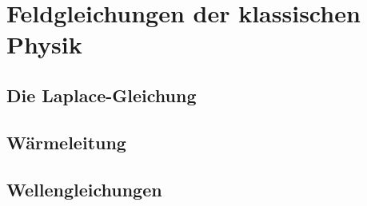 %
%
%
\chapter{Feldgleichungen der klassischen Physik
\label{chapter:feldgleichungen}}

\section{Die Laplace-Gleichung}

\section{Wärmeleitung}

\section{Wellengleichungen}



